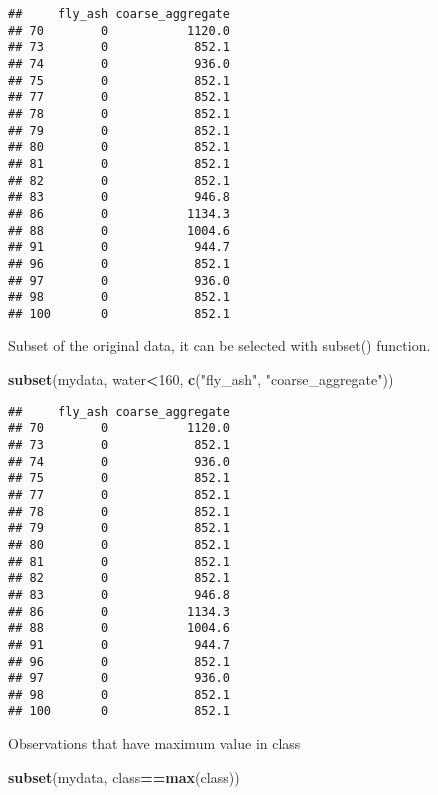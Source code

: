 \documentclass[]{article}
\newenvironment{Shaded}{\begin{snugshade}}{\end{snugshade}}
\newcommand{\DecValTok}[1]{\textcolor[rgb]{0.00,0.00,0.81}{#1}}
\newcommand{\KeywordTok}[1]{\textcolor[rgb]{0.13,0.29,0.53}{\textbf{#1}}}
\newcommand{\NormalTok}[1]{#1}
\newcommand{\OperatorTok}[1]{\textcolor[rgb]{0.81,0.36,0.00}{\textbf{#1}}}
\newcommand{\StringTok}[1]{\textcolor[rgb]{0.31,0.60,0.02}{#1}}
\begin{document}
\begin{verbatim}
##     fly_ash coarse_aggregate
## 70        0           1120.0
## 73        0            852.1
## 74        0            936.0
## 75        0            852.1
## 77        0            852.1
## 78        0            852.1
## 79        0            852.1
## 80        0            852.1
## 81        0            852.1
## 82        0            852.1
## 83        0            946.8
## 86        0           1134.3
## 88        0           1004.6
## 91        0            944.7
## 96        0            852.1
## 97        0            936.0
## 98        0            852.1
## 100       0            852.1
\end{verbatim}

Subset of the original data, it can be selected with subset() function.

\begin{Shaded}
\begin{Highlighting}[]
\KeywordTok{subset}\NormalTok{(mydata, water}\OperatorTok{<}\DecValTok{160}\NormalTok{, }\KeywordTok{c}\NormalTok{(}\StringTok{"fly_ash"}\NormalTok{, }\StringTok{"coarse_aggregate"}\NormalTok{))}
\end{Highlighting}
\end{Shaded}

\begin{verbatim}
##     fly_ash coarse_aggregate
## 70        0           1120.0
## 73        0            852.1
## 74        0            936.0
## 75        0            852.1
## 77        0            852.1
## 78        0            852.1
## 79        0            852.1
## 80        0            852.1
## 81        0            852.1
## 82        0            852.1
## 83        0            946.8
## 86        0           1134.3
## 88        0           1004.6
## 91        0            944.7
## 96        0            852.1
## 97        0            936.0
## 98        0            852.1
## 100       0            852.1
\end{verbatim}

Observations that have maximum value in class

\begin{Shaded}
\begin{Highlighting}[]
\KeywordTok{subset}\NormalTok{(mydata, class}\OperatorTok{==}\KeywordTok{max}\NormalTok{(class))}
\end{Highlighting}
\end{Shaded}
\end{document}
